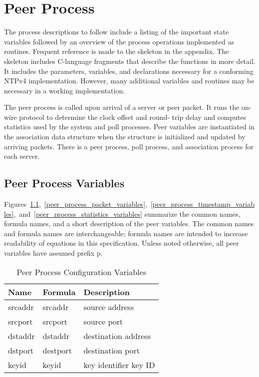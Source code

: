 \chapter{Peer Process}
\label{section-9}

The process descriptions to follow include a listing of the important
state variables followed by an overview of the process operations
implemented as routines. Frequent reference is made to the skeleton
in the appendix. The skeleton includes C-language fragments that
describe the functions in more detail. It includes the parameters,
variables, and declarations necessary for a conforming NTPv4
implementation. However, many additional variables and routines may
be necessary in a working implementation.

The peer process is called upon arrival of a server or peer packet.
It runs the on-wire protocol to determine the clock offset and round-
trip delay and computes statistics used by the system and poll
processes. Peer variables are instantiated in the association data
structure when the structure is initialized and updated by arriving
packets. There is a peer process, poll process, and association
process for each server.

\section{Peer Process Variables}
\label{section-9-1}

Figures~\ref{peer_process_configuration_variables},~\ref{peer_process_packet_variables},~\ref{peer_process_timestamp_variables},~and~\ref{peer_process_statistics_variables} summarize the common names, formula names,
and a short description of the peer variables. The common names and
formula names are interchangeable; formula names are intended to
increase readability of equations in this specification. Unless
noted otherwise, all peer variables have assumed prefix p.

\begin{table}[htb]
  \center
  \begin{tabular}{| l | l | l |}
    \hline
    Name & Formula & Description \\
    \hline
    \hline
    srcaddr & srcaddr & source address \\
    srcport & srcport & source port \\
    dstaddr & dstaddr & destination address \\
    dstport & destport & destination port \\
    keyid & keyid & key identifier key ID \\
    \hline
  \end{tabular}
  \caption{Peer Process Configuration Variables}
  \label{peer_process_configuration_variables}
\end{table}


